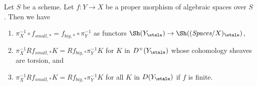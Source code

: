 \begin{lemma}
\label{lemma-compare-higher-direct-image-proper}
Let $S$ be a scheme.
Let $f : Y \to X$ be a proper morphism of algebraic spaces over $S$.
Then we have
\begin{enumerate}
\item $\pi_X^{-1} \circ f_{small, *} = f_{big, *} \circ \pi_Y^{-1}$
as functors $\Sh(Y_\etale) \to \Sh((\textit{Spaces}/X)_\etale)$,
\item $\pi_X^{-1}Rf_{small, *}K = Rf_{big, *}\pi_Y^{-1}K$
for $K$ in $D^+(Y_\etale)$ whose cohomology sheaves are torsion, and
\item $\pi_X^{-1}Rf_{small, *}K = Rf_{big, *}\pi_Y^{-1}K$
for all $K$ in $D(Y_\etale)$ if $f$ is finite.
\end{enumerate}
\end{lemma}

